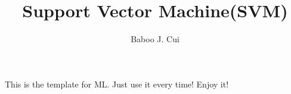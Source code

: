 \documentclass[10pt,a4paper,oneside]{article}
\author{Baboo J. Cui}
\begin{document}
\title{Support Vector Machine(SVM)}
\maketitle

This is the template for ML. Just use it every time! Enjoy it!
\end{document}
